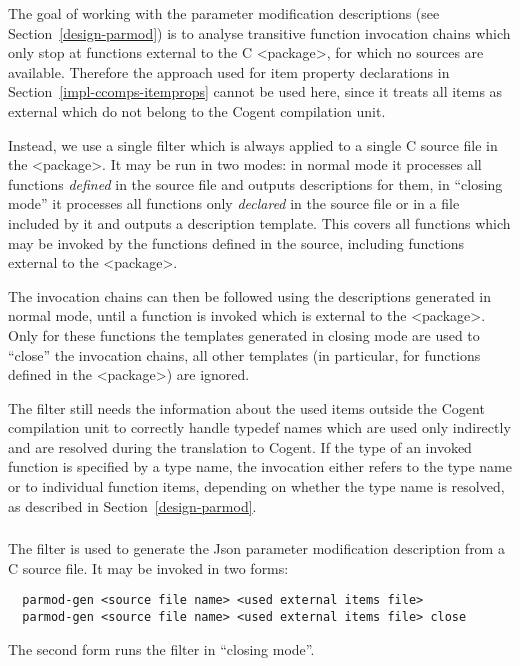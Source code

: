 The goal of working with the parameter modification descriptions (see Section~\ref{design-parmod}) is to analyse 
transitive function invocation chains which only stop at functions external to the C <package>, for which no sources
are available. Therefore the approach used for item property declarations in Section~\ref{impl-ccomps-itemprops}
cannot be used here, since it treats all items as external which do not belong to the Cogent compilation unit.

Instead, we use a single filter  which is always applied to a single C source file in the 
<package>. It may be run in two modes: in normal mode it processes all functions \textit{defined} in the source
file and outputs descriptions for them, in ``closing mode'' it processes all functions only \textit{declared} in 
the source file or in a file included by it and outputs a description template. This covers all functions which 
may be invoked by the functions defined in the source, including functions external to the <package>. 

The invocation chains can then be followed using the descriptions generated in normal mode, until a function is invoked
which is external to the <package>. Only for these functions the templates generated in closing mode are used
to ``close'' the invocation chains, all other templates (in particular, for functions defined in the <package>)
are ignored.

The filter still needs the information about the used items outside the Cogent compilation unit to correctly handle
typedef names which are used only indirectly and are resolved during the translation to Cogent. If the type of an
invoked function is specified by a type name, the invocation either refers to the type name or to individual function items,
depending on whether the type name is resolved, as described in Section~\ref{design-parmod}.

\subsubsection{}

The filter  is used to generate the Json parameter modification description from a C source file.
It may be invoked in two forms:
\begin{verbatim}
  parmod-gen <source file name> <used external items file>
  parmod-gen <source file name> <used external items file> close
\end{verbatim}
The second form runs the filter in ``closing mode''.

